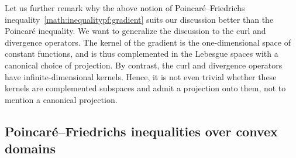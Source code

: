 \documentclass[12pt,a4paper]{article}
\begin{document}
\begin{remark}
    Let us further remark why the above notion of Poincar\'e--Friedrichs inequality~\eqref{math:inequalitypf:gradient} suits our discussion better than the Poincar\'e inequality. 
    We want to generalize the discussion to the curl and divergence operators. 
    The kernel of the gradient is the one-dimensional space of constant functions, and is thus complemented in the Lebesgue spaces with a canonical choice of projection. 
    By contrast, the curl and divergence operators have infinite-dimensional kernels. 
    Hence, it is not even trivial whether these kernels are complemented subspaces and admit a projection onto them, not to mention a canonical projection. 
\end{remark}




\subsection{Poincar\'e--Friedrichs inequalities over convex domains}
\end{document}

